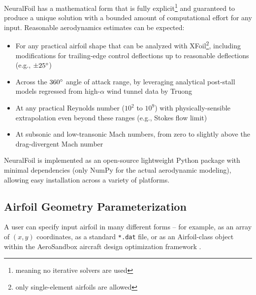 \documentclass[conf]{new-aiaa}
\begin{document}
    NeuralFoil has a mathematical form that is fully explicit\footnote{meaning no iterative solvers are used} and guaranteed to produce a unique solution with a bounded amount of computational effort for any input. Reasonable aerodynamics estimates can be expected:
    \begin{itemize}
        \item For any practical airfoil shape that can be analyzed with XFoil\footnote{only single-element airfoils are allowed}, including modifications for trailing-edge control deflections up to reasonable deflections (e.g., $\pm 25\degree$)
        \item Across the $360\degree$ angle of attack range, by leveraging analytical post-stall models regressed from high-$\alpha$ wind tunnel data by Truong \cite{truong_analytical_2020}
        \item At any practical Reynolds number ($10^2$ to $10^9$) with physically-sensible extrapolation even beyond these ranges (e.g., Stokes flow limit)
        \item At subsonic and low-transonic Mach numbers, from zero to slightly above the drag-divergent Mach number
    \end{itemize}

    NeuralFoil is implemented as an open-source lightweight Python package with minimal dependencies (only NumPy \cite{harris_array_2020} for the actual aerodynamic modeling), allowing easy installation across a variety of platforms.

    \subsection{Airfoil Geometry Parameterization}
    \label{sec:airfoil-parameterization}

    A user can specify input airfoil in many different forms -- for example, as an array of $(x, y)$ coordinates, as a standard \texttt{*.dat} file, or as an Airfoil-class object within the AeroSandbox aircraft design optimization framework \cite{sharpe_aerosandbox_2021}.
\end{document}
